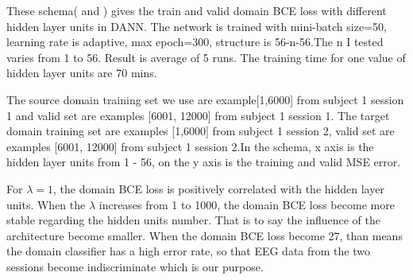 These schema( and ) gives the train and valid domain BCE loss with different hidden layer units in DANN. The network is trained with mini-batch size=50, learning rate is adaptive, max epoch=300, structure is 56-n-56.The n I tested varies from 1 to 56. Result is average of 5 runs. The training time for one value of hidden layer units are 70 mins.

The source domain training set we use are example[1,6000] from subject 1 session 1 and valid set are examples [6001, 12000] from subject 1 session 1. The target domain training set are examples [1,6000] from subject 1 session 2, valid set are examples [6001, 12000] from subject 1 session 2.In the schema, x axis is the hidden layer units from 1 - 56, on the y axis is the training and valid MSE error.

For $\lambda = 1$, the domain BCE loss is positively correlated with the hidden layer units. When the $\lambda$ increases from 1 to 1000, the domain BCE loss become more stable regarding the hidden units number. That is to say the influence of the architecture become smaller. When the domain BCE loss become 27, than means the domain classifier has a high error rate, so that EEG data from the two sessions become indiscriminate which is our purpose.